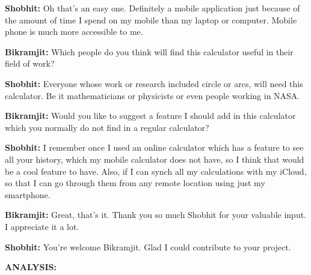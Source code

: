 \documentclass[12pt]{article}
\begin{document}
\begin{justify}
\textbf{Shobhit: }Oh that’s an easy one. Definitely a mobile application just because of the amount of time I spend on my mobile than my laptop or computer. Mobile phone is much more accessible to me.
\end{justify}\par

\begin{justify}
\textbf{Bikramjit: }Which people do you think will find this calculator useful in their field of work?
\end{justify}\par

\begin{justify}
\textbf{Shobhit: }Everyone whose work or research included circle or arcs, will need this calculator. Be it mathematicians or physicists or even people working in NASA.
\end{justify}\par

\begin{justify}
\textbf{Bikramjit: } Would you like to suggest a feature I should add in this calculator which you normally do not find in a regular calculator?
\end{justify}\par

\begin{justify}
\textbf{Shobhit: }I remember once I used an online calculator which has a feature to see all your history, which my mobile calculator does not have, so I think that would be a cool feature to have. Also, if I can synch all my calculations with my iCloud, so that I can go through them from any remote location using just my smartphone.
\end{justify}\par

\begin{justify}
\textbf{Bikramjit: }Great, that’s it. Thank you so much Shobhit for your valuable input. I appreciate it a lot. 
\end{justify}\par

\begin{justify}
\textbf{Shobhit: }You’re welcome Bikramjit. Glad I could contribute to your project.
\end{justify}\par

\begin{justify}
\textbf{ANALYSIS: }
\end{justify}\par
\end{document}
